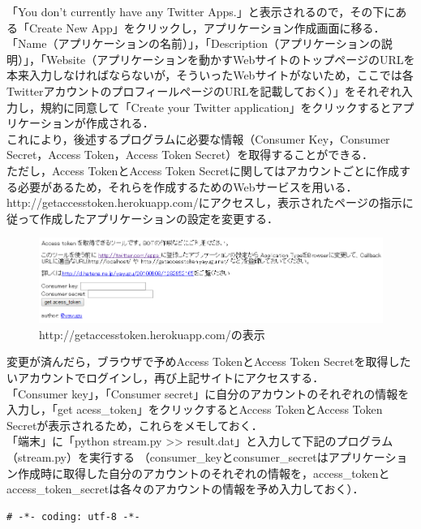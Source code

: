 \begin{description}
	「You don't currently have any Twitter Apps.」と表示されるので，その下にある「Create New App」をクリックし，アプリケーション作成画面に移る．\\
	「Name（アプリケーションの名前）」，「Description（アプリケーションの説明）」，「Website（アプリケーションを動かすWebサイトのトップページのURLを本来入力しなければならないが，そういったWebサイトがないため，ここでは各TwitterアカウントのプロフィールページのURLを記載しておく）」をそれぞれ入力し，規約に同意して「Create your Twitter application」をクリックするとアプリケーションが作成される．\\
	これにより，後述するプログラムに必要な情報（Consumer Key，Consumer Secret，Access Token，Access Token Secret）を取得することができる．\\
	ただし，Access TokenとAccess Token Secretに関してはアカウントごとに作成する必要があるため，それらを作成するためのWebサービスを用いる．\\
	http://getaccesstoken.herokuapp.com/にアクセスし，表示されたページの指示に従って作成したアプリケーションの設定を変更する．
	
	\begin{figure}[H]
	\centering
	\includegraphics[width=15cm]{get_access_token.PNG}
	\caption{http://getaccesstoken.herokuapp.com/の表示}\label{getaccesstoken}
	\end{figure}
	
	変更が済んだら，ブラウザで予めAccess TokenとAccess Token Secretを取得したいアカウントでログインし，再び上記サイトにアクセスする．\\
	「Consumer key」，「Consumer secret」に自分のアカウントのそれぞれの情報を入力し，「get acess\_token」をクリックするとAccess TokenとAccess Token Secretが表示されるため，これらをメモしておく．\\
	「端末」に「python stream.py >> result.dat」と入力して下記のプログラム（stream.py）を実行する
	（consumer\_keyとconsumer\_secretはアプリケーション作成時に取得した自分のアカウントのそれぞれの情報を，access\_tokenとaccess\_token\_secretは各々のアカウントの情報を予め入力しておく）．
		\begin{lstlisting}[caption={}, label={}]
			# -*- coding: utf-8 -*-
 

\end{lstlisting}
\end{description}
